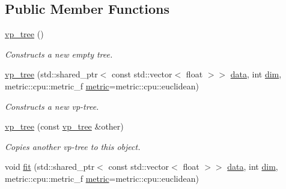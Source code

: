\subsection*{Public Member Functions}
\begin{DoxyCompactItemize}
\item 
\hypertarget{classtree_1_1cpu_1_1vp__tree_a2ca59caf1f9c8fb271ef1a2947a69857}{}\hyperlink{classtree_1_1cpu_1_1vp__tree_a2ca59caf1f9c8fb271ef1a2947a69857}{vp\+\_\+tree} ()\label{classtree_1_1cpu_1_1vp__tree_a2ca59caf1f9c8fb271ef1a2947a69857}

\begin{DoxyCompactList}\small\item\em Constructs a new empty tree. \end{DoxyCompactList}\item 
\hyperlink{classtree_1_1cpu_1_1vp__tree_ac374600ef88cda498f56c0c74507b9da}{vp\+\_\+tree} (std\+::shared\+\_\+ptr$<$ const std\+::vector$<$ float $>$$>$ \hyperlink{classtree_1_1vp__tree_a0ac835729832f805cfde6375891f9073}{data}, int \hyperlink{classtree_1_1vp__tree_a9654dfc1b8ec7db0718f3d98a9efe5e1}{dim}, metric\+::cpu\+::metric\+\_\+f \hyperlink{classtree_1_1cpu_1_1vp__tree_a174296b009a968f5805f17ea013d06cb}{metric}=metric\+::cpu\+::euclidean)
\begin{DoxyCompactList}\small\item\em Constructs a new vp-\/tree. \end{DoxyCompactList}\item 
\hypertarget{classtree_1_1cpu_1_1vp__tree_a8119b9544df022460130563cb1a32b4b}{}\hyperlink{classtree_1_1cpu_1_1vp__tree_a8119b9544df022460130563cb1a32b4b}{vp\+\_\+tree} (const \hyperlink{classtree_1_1cpu_1_1vp__tree}{vp\+\_\+tree} \&other)\label{classtree_1_1cpu_1_1vp__tree_a8119b9544df022460130563cb1a32b4b}

\begin{DoxyCompactList}\small\item\em Copies another vp-\/tree to this object. \end{DoxyCompactList}\item 
\hypertarget{classtree_1_1cpu_1_1vp__tree_a77bbd3d462b5b464b3c775cf296c1178}{}void \hyperlink{classtree_1_1cpu_1_1vp__tree_a77bbd3d462b5b464b3c775cf296c1178}{fit} (std\+::shared\+\_\+ptr$<$ const std\+::vector$<$ float $>$$>$ \hyperlink{classtree_1_1vp__tree_a0ac835729832f805cfde6375891f9073}{data}, int \hyperlink{classtree_1_1vp__tree_a9654dfc1b8ec7db0718f3d98a9efe5e1}{dim}, metric\+::cpu\+::metric\+\_\+f \hyperlink{classtree_1_1cpu_1_1vp__tree_a174296b009a968f5805f17ea013d06cb}{metric}=metric\+::cpu\+::euclidean)\label{classtree_1_1cpu_1_1vp__tree_a77bbd3d462b5b464b3c775cf296c1178}


\end{DoxyCompactItemize}
